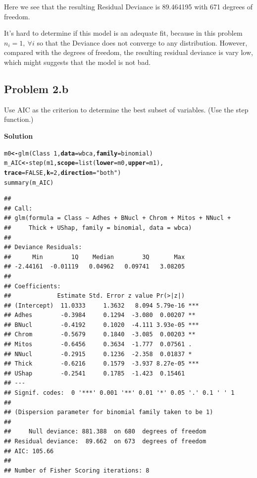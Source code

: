 \documentclass[12pt,oneside,a4paper]{article}\usepackage[]{graphicx}\usepackage[]{xcolor}
\makeatletter
\newcommand{\hlnum}[1]{\textcolor[rgb]{0,0,0}{#1}}%
\newcommand{\hlstr}[1]{\textcolor[rgb]{0,0,1}{#1}}%
\newcommand{\hlopt}[1]{\textcolor[rgb]{0,0,0}{#1}}%
\newcommand{\hlstd}[1]{\textcolor[rgb]{0,0,0}{#1}}%
\newcommand{\hlkwb}[1]{\textcolor[rgb]{0.498,0,0.333}{\textbf{#1}}}%
\newcommand{\hlkwc}[1]{\textcolor[rgb]{0.498,0,0.333}{\textbf{#1}}}%
\newcommand{\hlkwd}[1]{\textcolor[rgb]{0,0,0}{#1}}%
\newenvironment{kframe}{%
 \def\at@end@of@kframe{}%
 \ifinner\ifhmode%
  \def\at@end@of@kframe{\end{minipage}}%
  \begin{minipage}{\columnwidth}%
 \fi\fi%
 \def\FrameCommand##1{\hskip\@totalleftmargin \hskip-\fboxsep
 \colorbox{shadecolor}{##1}\hskip-\fboxsep
     \hskip-\linewidth \hskip-\@totalleftmargin \hskip\columnwidth}%
 \MakeFramed {\advance\hsize-\width
   \@totalleftmargin\z@ \linewidth\hsize
   \@setminipage}}%
 {\par\unskip\endMakeFramed%
 \at@end@of@kframe}
\newenvironment{knitrout}{}{} %
\newcommand{\subproblem}[1]
{
    \subsection*{Problem {#1}}
}
\newcommand{\solution}
{
    \vspace{15pt}
    \noindent\ignorespaces\textbf{\large Solution}\par
}
\makeatother
\begin{document}
Here we see that the resulting Residual Deviance is 89.464195 with 671 degrees of freedom. 

It's hard to determine if this model is an adequate fit, because in this problem $n_{i} = 1,~\forall i$ so that the Deviance does not converge to any distribution. However, compared with the degrees of freedom, the resulting residual deviance is vary low, which might suggests that the model is not bad.

\subproblem{2.b}
Use AIC as the criterion to determine the best subset of variables. (Use the step function.)

\solution
\begin{knitrout}
\color{fgcolor}\begin{kframe}
\begin{alltt}
\hlstd{m0} \hlkwb{<-} \hlkwd{glm}\hlstd{(Class} \hlopt{~} \hlnum{1}\hlstd{,} \hlkwc{data} \hlstd{= wbca,} \hlkwc{family} \hlstd{= binomial)}
\hlstd{m_AIC} \hlkwb{<-} \hlkwd{step}\hlstd{(m1,} \hlkwc{scope} \hlstd{=} \hlkwd{list}\hlstd{(}\hlkwc{lower} \hlstd{= m0,} \hlkwc{upper} \hlstd{= m1),}
     \hlkwc{trace} \hlstd{=} \hlnum{FALSE}\hlstd{,} \hlkwc{k} \hlstd{=} \hlnum{2}\hlstd{,} \hlkwc{direction} \hlstd{=} \hlstr{"both"}\hlstd{)}
\hlkwd{summary}\hlstd{(m_AIC)}
\end{alltt}
\begin{verbatim}
## 
## Call:
## glm(formula = Class ~ Adhes + BNucl + Chrom + Mitos + NNucl + 
##     Thick + UShap, family = binomial, data = wbca)
## 
## Deviance Residuals: 
##      Min        1Q    Median        3Q       Max  
## -2.44161  -0.01119   0.04962   0.09741   3.08205  
## 
## Coefficients:
##             Estimate Std. Error z value Pr(>|z|)    
## (Intercept)  11.0333     1.3632   8.094 5.79e-16 ***
## Adhes        -0.3984     0.1294  -3.080  0.00207 ** 
## BNucl        -0.4192     0.1020  -4.111 3.93e-05 ***
## Chrom        -0.5679     0.1840  -3.085  0.00203 ** 
## Mitos        -0.6456     0.3634  -1.777  0.07561 .  
## NNucl        -0.2915     0.1236  -2.358  0.01837 *  
## Thick        -0.6216     0.1579  -3.937 8.27e-05 ***
## UShap        -0.2541     0.1785  -1.423  0.15461    
## ---
## Signif. codes:  0 '***' 0.001 '**' 0.01 '*' 0.05 '.' 0.1 ' ' 1
## 
## (Dispersion parameter for binomial family taken to be 1)
## 
##     Null deviance: 881.388  on 680  degrees of freedom
## Residual deviance:  89.662  on 673  degrees of freedom
## AIC: 105.66
## 
## Number of Fisher Scoring iterations: 8
\end{verbatim}
\end{kframe}
\end{knitrout}
\end{document}
